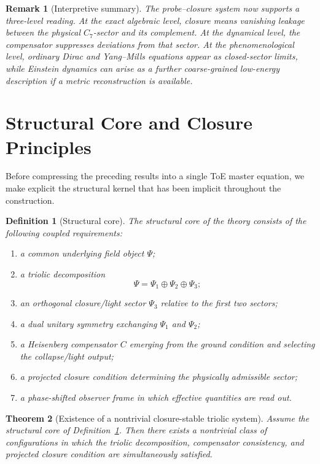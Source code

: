 \documentclass[12pt,a4paper]{article}
\newtheorem{theorem}{Theorem}[section]
\newtheorem{definition}[theorem]{Definition}
\newtheorem*{remark}{Remark}
\begin{document}
\begin{remark}[Interpretive summary]
The probe--closure system now supports a three-level reading.
At the exact algebraic level, closure means vanishing leakage between the
physical $C_7$-sector and its complement.
At the dynamical level, the compensator suppresses deviations from that
sector.
At the phenomenological level, ordinary Dirac and Yang--Mills equations
appear as closed-sector limits, while Einstein dynamics can arise as a
further coarse-grained low-energy description if a metric reconstruction is
available.
\end{remark}



\section{Structural Core and Closure Principles}
\label{sec:structural-core}

Before compressing the preceding results into a single ToE master equation, we
make explicit the structural kernel that has been implicit throughout the
construction.

\begin{definition}[Structural core]
\label{def:structural-core}
The structural core of the theory consists of the following coupled
requirements:
\begin{enumerate}
\item a common underlying field object $\Psi$;
\item a triolic decomposition
\[
  \Psi = \Psi_1\oplus\Psi_2\oplus\Psi_3;
\]
\item an orthogonal closure/light sector $\Psi_3$ relative to the first two
sectors;
\item a dual unitary symmetry exchanging $\Psi_1$ and $\Psi_2$;
\item a Heisenberg compensator $C$ emerging from the ground condition and
selecting the collapse/light output;
\item a projected closure condition determining the physically admissible
sector;
\item a phase-shifted observer frame in which effective quantities are read
out.
\end{enumerate}
\end{definition}

\begin{theorem}[Existence of a nontrivial closure-stable triolic system]
\label{thm:structural-existence}
Assume the structural core of Definition~\ref{def:structural-core}. Then there
exists a nontrivial class of configurations in which the triolic decomposition,
compensator consistency, and projected closure condition are simultaneously
satisfied.
\end{theorem}
\end{document}
